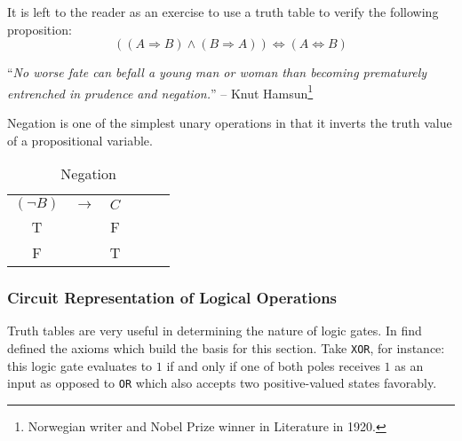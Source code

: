 \begin{exm}\label{exm-logical-equivalent}
	It is left to the reader as an exercise to use a truth table to verify the
	following proposition:
	\begin{equation}
		\left((A \Rightarrow B) \land (B \Rightarrow A)\right) \Leftrightarrow (A \Leftrightarrow B)
	\end{equation}
\end{exm}

\begin{displayquote}
	``\emph{No worse fate can befall a young man or woman than becoming prematurely
		entrenched in prudence and negation.}''
	-- Knut Hamsun\footnote{Norwegian writer and Nobel Prize winner in Literature
		in 1920.}
\end{displayquote}

Negation is one of the simplest unary operations in that it inverts the truth
value of a propositional variable.

\begin{table}[hbt!]
	\centering
	\begin{tabular}{*{6}{c}}
		$(\neg B)$ & $\rightarrow$ & $C$ \\
		T          &               & F   \\
		F          &               & T   \\
	\end{tabular}
	\caption{Negation}\label{table-negation}
\end{table}


\subsubsection{Circuit Representation of Logical Operations}\label{subsubsec-circuit-representation}

Truth tables are very useful in determining the nature of logic gates.
In  find defined the axioms which build the basis
for this section. Take \texttt{XOR}, for instance: this logic gate evaluates to $1$
if and only if one of both poles receives $1$ as an input as opposed to \texttt{OR}
which also accepts two positive-valued states favorably.

